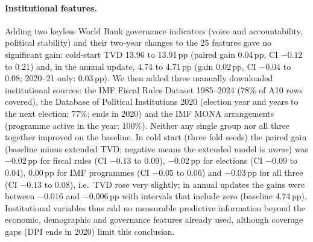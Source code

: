 \paragraph{Institutional features.} Adding two keyless World Bank governance indicators (voice and accountability, political stability) and their two-year changes to the 25 features gave no significant gain: cold-start TVD 13.96 to 13.91\,pp (paired gain 0.04\,pp, CI $-0.12$ to 0.21) and, in the annual update, 4.74 to 4.71\,pp (gain 0.02\,pp, CI $-0.04$ to 0.08; 2020--21 only: 0.03\,pp). We then added three manually downloaded institutional sources: the IMF Fiscal Rules Dataset 1985--2024 (78\% of A10 rows covered), the Database of Political Institutions 2020 (election year and years to the next election; 77\%; ends in 2020) and the IMF MONA arrangements (programme active in the year; 100\%). Neither any single group nor all three together improved on the baseline. In cold start (three fold seeds) the paired gain (baseline minus extended TVD; negative means the extended model is \emph{worse}) was $-0.02$\,pp for fiscal rules (CI $-0.13$ to 0.09), $-0.02$\,pp for elections (CI $-0.09$ to 0.04), 0.00\,pp for IMF programmes (CI $-0.05$ to 0.06) and $-0.03$\,pp for all three (CI $-0.13$ to 0.08), i.e.\ TVD rose very slightly; in annual updates the gains were between $-0.016$ and $-0.006$\,pp with intervals that include zero (baseline 4.74\,pp). Institutional variables thus add no measurable predictive information beyond the economic, demographic and governance features already used, although coverage gaps (DPI ends in 2020) limit this conclusion.
